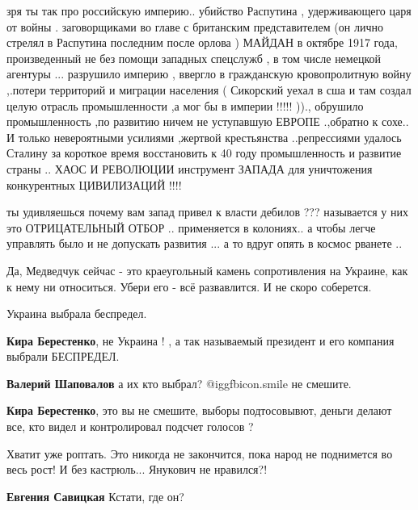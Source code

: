 \begin{itemize}

зря ты так про российскую империю.. убийство Распутина , удерживающего царя от
войны . заговорщиками во главе с британским представителем (он лично стрелял в
Распутина последним после орлова ) МАЙДАН в октябре 1917 года, произведенный не
без помощи западных спецслужб , в том числе немецкой агентуры ... разрушило
империю , ввергло в гражданскую кровопролитную войну ,.потери территорий и
миграции населения ( Сикорский уехал в сша и там создал целую отрасль
промышленности ,а мог бы в империи !!!!! ))., обрушило промышленность ,по
развитию ничем не уступавшую ЕВРОПЕ .,обратно к сохе.. И только невероятными
усилиями ,жертвой крестьянства ..репрессиями удалось Сталину за короткое время
восстановить к 40 году промышленность и развитие страны .. ХАОС И РЕВОЛЮЦИИ
инструмент ЗАПАДА для уничтожения конкурентных ЦИВИЛИЗАЦИЙ !!!!


ты удивляешься почему вам запад привел к власти дебилов ??? называется у них
это ОТРИЦАТЕЛЬНЫЙ ОТБОР .. применяется в колониях.. а чтобы легче управлять
было и не допускать развития ... а то вдруг опять в космос рванете ..


Да, Медведчук сейчас - это краеугольный камень сопротивления на Украине, как к
нему ни относиться. Убери его - всё развавлится. И не скоро соберется.


Украина выбрала беспредел.

\begin{itemize} %
\textbf{Кира Берестенко}, не Украина ! , а так называемый президент и его компания выбрали БЕСПРЕДЕЛ.

\textbf{Валерий Шаповалов} а их кто выбрал?  @igg{fbicon.smile}  не смешите.

\textbf{Кира Берестенко}, это вы не смешите, выборы подтосовывют, деньги делают все, кто видел и контролировал подсчет голосов ?
\end{itemize} %

Хватит уже роптать.
Это никогда не закончится, пока народ не поднимется во весь рост! И без кастрюль...
Янукович не нравился?!

\begin{itemize} %
\textbf{Евгения Савицкая} Кстати, где он?


\end{itemize}
\end{itemize}
